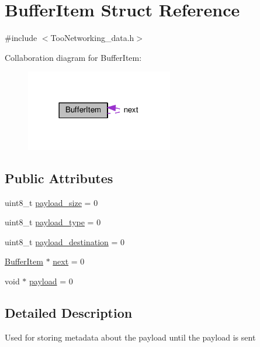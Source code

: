 \hypertarget{structBufferItem}{}\section{Buffer\+Item Struct Reference}
\label{structBufferItem}


{\ttfamily \#include $<$Too\+Networking\+\_\+data.\+h$>$}



Collaboration diagram for Buffer\+Item\+:\nopagebreak
\begin{figure}[H]
\begin{center}
\leavevmode
\includegraphics[width=182pt]{structBufferItem__coll__graph}
\end{center}
\end{figure}
\subsection*{Public Attributes}
\begin{DoxyCompactItemize}
\item 
uint8\+\_\+t \hyperlink{structBufferItem_a5c3187c383ceec1825964d5e512273de}{payload\+\_\+size} = 0
\item 
uint8\+\_\+t \hyperlink{structBufferItem_a3d7529f54e1e8ffaa3ee3b85ae0ebbbd}{payload\+\_\+type} = 0
\item 
uint8\+\_\+t \hyperlink{structBufferItem_a2e475a18a6671f1f0c4bf3010d7a6e89}{payload\+\_\+destination} = 0
\item 
\hyperlink{structBufferItem}{Buffer\+Item} $\ast$ \hyperlink{structBufferItem_a0b7574f1fee48cbb04176af01f9d810f}{next} = 0
\item 
void $\ast$ \hyperlink{structBufferItem_a0ec6d94d7df8c1e9db526fa0200267bb}{payload} = 0
\end{DoxyCompactItemize}


\subsection{Detailed Description}
Used for storing metadata about the payload until the payload is sent 

